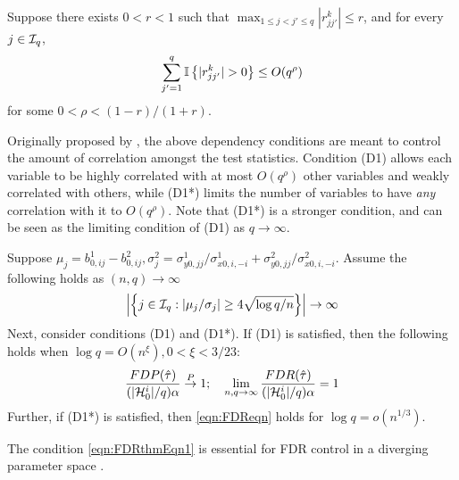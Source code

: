  Suppose there exists $0 < r < 1$ such that $\max_{1 \leq j < j' \leq q} | r_{jj'}^k | \leq r$, and for every $j \in {\cal{I}}_q$,
%
$$
\sum_{j'=1}^q {\mathbb{I}} \left\{ |r_{jj'}^k| > 0 \right\} \leq O(q^\rho)
$$
%
for some $0 < \rho < (1-r)/(1+r)$.

Originally proposed by \cite{LiuShao14}, the above dependency conditions are meant to control the amount of correlation amongst the test statistics. Condition (D1) allows each variable to be highly correlated with at most $O(q^\rho)$ other variables and weakly correlated with others, while (D1*) limits the number of variables to have {\it any} correlation with it to $O(q^\rho)$. Note that (D1*) is a stronger condition, and can be seen as the limiting condition of (D1) as $q \rightarrow \infty$.

\begin{Theorem}\label{thm:FDRthm}
Suppose $\mu_j = b_{0,ij}^1 - b_{0,ij}^2, \sigma_j^2 = \sigma_{y0,jj}^1/ \sigma_{x0,i,-i}^1 + \sigma_{y0,jj}^2/ \sigma_{x0,i,-i}^2$. Assume the following holds as $(n,q) \rightarrow \infty$
%
\begin{align}\label{eqn:FDRthmEqn1}
\left| \left\{ j \in {\cal{I}}_q: |\mu_j / \sigma_j | \geq
4 \sqrt{ \log q/n} \right\} \right| \rightarrow \infty
\end{align}
%
Next, consider conditions (D1) and (D1*). If (D1) is satisfied, then the following holds when $\log q = O(n^{\xi}), 0 < \xi < 3/23$:
%
\begin{align}\label{eqn:FDReqn}
\frac{FDP( \hat \tau)}{(| {\cal{H}}_0^i|/q) \alpha} \stackrel{P}{\rightarrow} 1; \quad
\lim_{n, q \rightarrow \infty} \frac{FDR( \hat \tau)}{(| {\cal{H}}_0^i|/q) \alpha} = 1
\end{align}
%
Further, if (D1*) is satisfied, then \eqref{eqn:FDReqn} holds for $\log q = o(n^{1/3})$.
\end{Theorem}
%
The condition \eqref{eqn:FDRthmEqn1} is essential for FDR control in a diverging parameter space \citep{LiuShao14, Liu17}.

